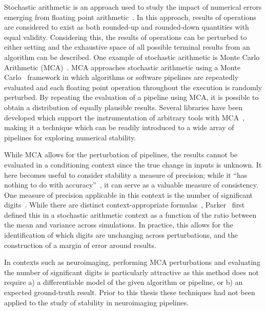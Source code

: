 Stochastic arithmetic is an approach used to study the impact of numerical errors emerging from floating point
arithmetic~\cite{vignes1993stochastic,connolly2020stochastic}. In this approach, results of operations are considered
to exist as both rounded-up and rounded-down quantities with equal validity. Considering this, the results of
operations can be perturbed to either setting and the exhaustive space of all possible terminal results from an
algorithm can be described. One example of stochastic arithmetic is Monte Carlo Arithmetic (MCA)~\cite{Parker1997-qq}.
MCA approaches stochastic arithmetic using a Monte Carlo~\cite{metropolis1949monte} framework in which algorithms
or software pipelines are repeatedly evaluated and each floating point operation throughout the execution is randomly
perturbed. By repeating the evaluation of a pipeline using MCA, it is possible to obtain a distribution of equally
plausible results. Several libraries have been developed which support the instrumentation of arbitrary tools with
MCA~\cite{frechtling2015mcalib,Denis2016-wo}, making it a technique which can be readily introduced to a wide array of
pipelines for exploring numerical stability.

While MCA allows for the perturbation of pipelines, the results cannot be evaluated in a conditioning context since the
true change in inputs is unknown. It here becomes useful to consider stability a measure of precision; while it ``has
nothing to do with accuracy''~\cite{kiusalaas2013numerical}, it can serve as a valuable measure of consistency. One
measure of precision applicable in this context is the number of significant digits~\cite{Parker1997-qq}. While there
are distinct context-appropriate formulas~\cite{sohier2018confidence}, Parker~\cite{Parker1997-qq} first defined this
in a stochastic arithmetic context as a function of the ratio between the mean and variance across simulations. In
practice, this allows for the identification of which digits are unchanging across perturbations, and the construction
of a margin of error around results.

In contexts such as neuroimaging, performing MCA perturbations and evaluating the number of significant digits is
particularly attractive as this method does not require a) a differentiable model of the given algorithm or pipeline,
or b) an expected ground-truth result. Prior to this thesis these techniques had not been applied to the study of
stability in neuroimaging pipelines.


